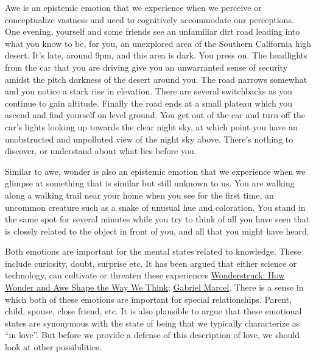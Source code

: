 \documentclass[
  letterpaper,
  DIV=11,
  numbers=noendperiod]{scrartcl}
\begin{document}
Awe is an epistemic emotion that we experience when we perceive or
conceptualize vastness and need to cognitively accommodate our
perceptions. One evening, yourself and some friends see an unfamiliar
dirt road leading into what you know to be, for you, an unexplored area
of the Southern California high desert. It's late, around 9pm, and this
area is dark. You press on. The headlights from the car that you are
driving give you an unwarranted sense of security amidst the pitch
darkness of the desert around you. The road narrows somewhat and you
notice a stark rise in elevation. There are several switchbacks as you
continue to gain altitude. Finally the road ends at a small plateau
which you ascend and find yourself on level ground. You get out of the
car and turn off the car's lights looking up towards the clear night
sky, at which point you have an unobstructed and unpolluted view of the
night sky above. There's nothing to discover, or understand about what
lies before you.

Similar to awe, wonder is also an epistemic emotion that we experience
when we glimpse at something that is similar but still unknown to us.
You are walking along a walking trail near your home when you see for
the first time, an uncommon creature such as a snake of unusual hue and
coloration. You stand in the same spot for several minutes while you try
to think of all you have seen that is closely related to the object in
front of you, and all that you might have heard.

Both emotions are important for the mental states related to knowledge.
These include curiosity, doubt, surprise etc. It has been argued that
either science or technology, can cultivate or threaten these
experiences
\href{https://app.notion.com/p/Wonderstruck-How-Wonder-and-Awe-Shape-the-Way-We-Think-3578935bcf8a811f827ae4e1b3d146e4?pvs=21}{Wonderstruck:
How Wonder and Awe Shape the Way We Think};
\href{https://app.notion.com/p/Gabriel-Marcel-34e8935bcf8a807591b4ec125449f587?pvs=21}{Gabriel
Marcel}. There is a sense in which both of these emotions are important
for special relationships. Parent, child, spouse, close friend, etc. It
is also plausible to argue that these emotional states are synonymous
with the state of being that we typically characterize as ``in love''.
But before we provide a defense of this description of love, we should
look at other possibilities.
\end{document}
